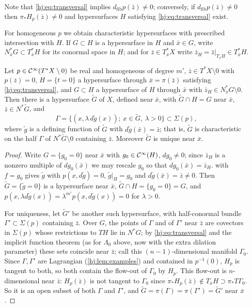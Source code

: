 Note that \eqref{hj:eq:transversal} implies $d_{\mathrm{fib}}p(\bar z)\ne0$;
conversely, if $d_{\mathrm{fib}}p(\bar z)\neq0$ then $\pi_*H_p(\bar z)\neq0$ and
hypersurfaces $H$ satisfying \eqref{hj:eq:transversal} exist.

For homogeneous $p$ we obtain characteristic hypersurfaces with prescribed
intersection with $H$.  If $G\subset H$ is a hypersurface in $H$ and $\bar
x\in G$, write $N^*_{\bar x}G\subset T^*_{\bar x}H$ for its conormal space in
$H$; and for $\bar z\in T^*_{\bar x}X$ write $\bar z_H=\bar z|_{T_{\bar x}H}\in
T^*_{\bar x}H$.

\begin{corollary}\label{hj:cor:characteristic}
  Let $p\in\mathcal{C}^\infty(T^*X\setminus0)$ be real and homogeneous of degree $m'$, $\bar z\in
  T^*X\setminus0$ with $p(\bar z)=0$, $H=\{t=0\}$ a hypersurface through $\bar
  x=\pi(\bar z)$ satisfying \eqref{hj:eq:transversal}, and $G\subset H$ a
  hypersurface of $H$ through $\bar x$ with $\bar z_H\in N^*_{\bar x}G\setminus0$.
  Then there is a hypersurface $\tilde G$ of $X$, defined near $\bar x$, with
  $\tilde G\cap H=G$ near $\bar x$, $\bar z\in N^*\tilde G$, and
  \begin{equation*}
    \Gamma=\{(x,\lambda\,d\tilde g(x));\ x\in\tilde G,\ \lambda>0\}\subset\Sigma(p),
  \end{equation*}
  where $\tilde g$ is a defining function of $\tilde G$ with $d\tilde g(\bar
  x)=\bar z$; that is, $\tilde G$ is characteristic on the half $\Gamma$ of
  $N^*\tilde G\setminus0$ containing $\bar z$.  Moreover $\tilde G$ is unique near
  $\bar x$.
\end{corollary}
\begin{proof}
  Write $G=\{g_0=0\}$ near $\bar x$ with $g_0\in\mathcal{C}^\infty(H)$, $dg_0\ne0$; since
  $\bar z_H$ is a nonzero multiple of $dg_0(\bar x)$ we may rescale $g_0$ so that
  $dg_0(\bar x)=\bar z_H$.   with $f=g_0$ gives $\tilde g$ with
  $p(x,d\tilde g)=0$, $\tilde g|_H=g_0$ and $d\tilde g(\bar x)=\bar z\ne0$.  Then
  $\tilde G=\{\tilde g=0\}$ is a hypersurface near $\bar x$, $\tilde G\cap
  H=\{g_0=0\}=G$, and $p(x,\lambda d\tilde g(x))=\lambda^{m'}p(x,d\tilde g(x))=0$
  for $\lambda>0$.

  For uniqueness, let $\tilde G'$ be another such hypersurface, with half-conormal
  bundle $\Gamma'\subset\Sigma(p)$ containing $\bar z$.  Over $G$, the points of
  $\Gamma$ and of $\Gamma'$ near $\bar z$ are covectors in $\Sigma(p)$ whose
  restrictions to $TH$ lie in $N^*G$; by \eqref{hj:eq:transversal} and the
  implicit function theorem (as for $\Lambda_0$ above, now with the extra
  dilation parameter) these sets coincide near $\bar z$; call this
  $(n-1)$-dimensional manifold $\Gamma_0$.  Since $\Gamma,\Gamma'$ are Lagrangian
  (\cref{hj:lem:examples}) and contained in $p^{-1}(0)$, $H_p$ is tangent to both,
  so both contain the flow-out of $\Gamma_0$ by $H_p$.  This flow-out is
  $n$-dimensional near $\bar z$: $H_p(\bar z)$ is not tangent to $\Gamma_0$ since
  $\pi_*H_p(\bar z)\notin T_{\bar x}H\supset\pi_*T\Gamma_0$.  So it is an open
  subset of both $\Gamma$ and $\Gamma'$, and $\tilde G=\pi(\Gamma)=\pi(\Gamma')=
  \tilde G'$ near $\bar x$.
\end{proof}

